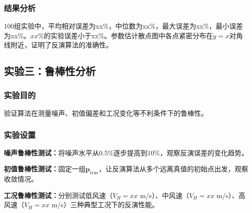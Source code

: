 \documentclass[withoutpreface,bwprint]{cumcmthesis}
\begin{document}



\subsubsection{结果分析}

100组实验中，平均相对误差为xx\%，中位数为xx\%，最大误差为xx\%，最小误差为xx\%。$xx\%$的实验误差小于xx\%。参数估计散点图中各点紧密分布在$y=x$对角线附近，证明了反演算法的准确性。

\subsection{实验三：鲁棒性分析}

\subsubsection{实验目的}

验证算法在测量噪声、初值偏差和工况变化等不利条件下的鲁棒性。

\subsubsection{实验设置}

\textbf{噪声鲁棒性测试：}将噪声水平从$0.5\%$逐步提高到$10\%$，观察反演误差的变化趋势。

\textbf{初值鲁棒性测试：}固定一组$\mathbf{p}_{\mathrm{true}}$，让反演算法从多个远离真值的初始点出发，观察收敛情况。

\textbf{工况鲁棒性测试：}分别测试低风速（$V_H=xx$ m/s）、中风速（$V_H=xx$ m/s）、高风速（$V_H=xx$ m/s）三种典型工况下的反演性能。
\end{document}
